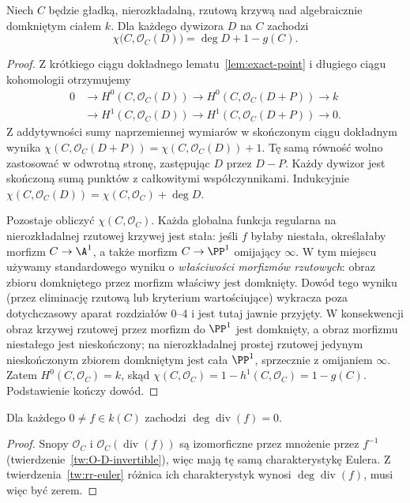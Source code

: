 \begin{twierdzenie}
\label{tw:rr-euler}
Niech $C$ będzie gładką, nierozkładalną,
rzutową krzywą nad algebraicznie domkniętym
ciałem $k$. Dla każdego dywizora $D$ na $C$
zachodzi
\[
 \chi\bigl(C,\mathcal O_C(D)\bigr)
   =\deg D+1-g(C).
\]
\end{twierdzenie}
\begin{proof}
Z krótkiego ciągu dokładnego
lematu~\ref{lem:exact-point} i długiego ciągu
kohomologii otrzymujemy
\[
\begin{aligned}
0&\longrightarrow H^0(C,\mathcal O_C(D))
\longrightarrow H^0(C,\mathcal O_C(D+P))
\longrightarrow k\\
&\longrightarrow H^1(C,\mathcal O_C(D))
\longrightarrow H^1(C,\mathcal O_C(D+P))
\longrightarrow0.
\end{aligned}
\]
Z addytywności sumy naprzemiennej wymiarów
w skończonym ciągu dokładnym wynika
$\chi(C,\mathcal O_C(D+P))=
\chi(C,\mathcal O_C(D))+1$.
Tę samą równość wolno zastosować w odwrotną
stronę, zastępując $D$ przez $D-P$.
Każdy dywizor jest skończoną sumą punktów
z całkowitymi współczynnikami. Indukcyjnie
$\chi(C,\mathcal O_C(D))=
\chi(C,\mathcal O_C)+\deg D$.

Pozostaje obliczyć $\chi(C,\mathcal O_C)$.
Każda globalna funkcja regularna na nierozkładalnej
rzutowej krzywej jest stała: jeśli $f$ byłaby
niestała, określałaby morfizm $C\to\A^1$,
a także morfizm $C\to\PP^1$ omijający
$\infty$. W tym miejscu używamy standardowego
wyniku o \emph{właściwości morfizmów rzutowych}:
obraz zbioru domkniętego przez morfizm właściwy
jest domknięty. Dowód tego wyniku (przez eliminację
rzutową lub kryterium wartościujące) wykracza poza
dotychczasowy aparat rozdziałów 0--4 i jest tutaj
jawnie przyjęty. W konsekwencji obraz krzywej
rzutowej przez morfizm do $\PP^1$ jest domknięty,
a obraz morfizmu niestałego jest nieskończony;
na nierozkładalnej prostej rzutowej jedynym
nieskończonym zbiorem domkniętym jest cała
$\PP^1$, sprzecznie z omijaniem $\infty$.
Zatem $H^0(C,\mathcal O_C)=k$, skąd
$\chi(C,\mathcal O_C)=1-h^1(C,\mathcal O_C)=1-g(C)$.
Podstawienie kończy dowód.
\end{proof}

\begin{wniosek}
\label{wn:div-zero}
Dla każdego $0\ne f\in k(C)$ zachodzi
$\deg\operatorname{div}(f)=0$.
\end{wniosek}
\begin{proof}
Snopy $\mathcal O_C$ i
$\mathcal O_C(\operatorname{div}(f))$ są izomorficzne
przez mnożenie przez $f^{-1}$
(twierdzenie~\ref{tw:O-D-invertible}),
więc mają tę samą charakterystykę Eulera.
Z twierdzenia~\ref{tw:rr-euler} różnica
ich charakterystyk wynosi
$\deg\operatorname{div}(f)$, musi więc być zerem.
\end{proof}


